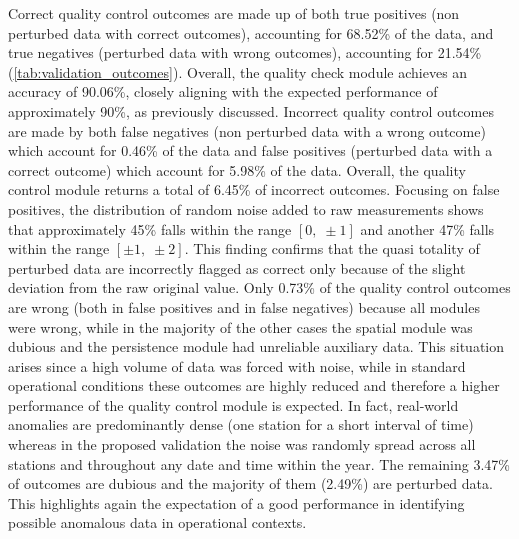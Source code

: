 \documentclass[authoryear,preprint,review,12pt]{elsarticle}
\begin{document}
Correct quality control outcomes are made up of both true positives (non perturbed data with correct outcomes), accounting for 68.52\% of the data, and true negatives (perturbed data with wrong outcomes), accounting for 21.54\% (\cref{tab:validation_outcomes}). 
Overall, the quality check module achieves an accuracy of 90.06\%, closely aligning with the expected performance of approximately 90\%, as previously discussed.
Incorrect quality control outcomes are made by both false negatives (non perturbed data with a wrong outcome) which account for 0.46\% of the data and false positives (perturbed data with a correct outcome) which account for 5.98\% of the data. 
Overall, the quality control module returns a total of 6.45\% of incorrect outcomes. 
Focusing on false positives, the distribution of random noise added to raw measurements shows that approximately 45\% falls within the range $[0,\; \pm1]$ and another 47\% falls within the range $[\pm1,\; \pm2]$. 
This finding confirms that the quasi totality of perturbed data are incorrectly flagged as correct only because of the slight deviation from the raw original value.
Only 0.73\% of the quality control outcomes are wrong (both in false positives and in false negatives) because all modules were wrong, while in the majority of the other cases the spatial module was dubious and the persistence module had unreliable auxiliary data.
This situation arises since a high volume of data was forced with noise, while in standard operational conditions these outcomes are highly reduced and therefore a higher performance of the quality control module is expected.
In fact, real-world anomalies are predominantly dense (one station for a short interval of time) whereas in the proposed validation the noise was randomly spread across all stations and throughout any date and time within the year. 
The remaining 3.47\% of outcomes are dubious and the majority of them (2.49\%) are perturbed data. This highlights again the expectation of a good performance in identifying possible anomalous data in operational contexts.
\end{document}
